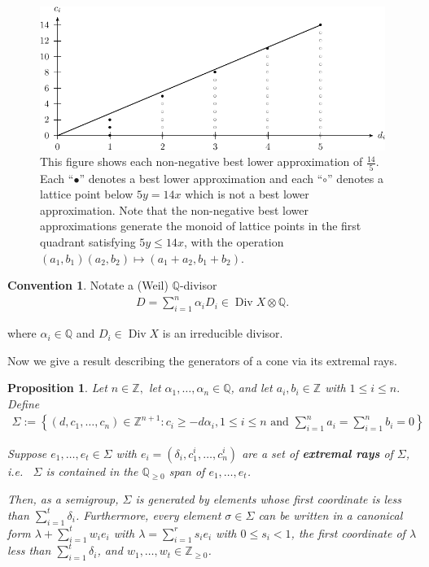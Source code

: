 \documentclass{amsart}
\theoremstyle{plain}
\newtheorem{prop}[thm]{Proposition}
\theoremstyle{definition}
\newtheorem{convention}[thm]{Convention}
\theoremstyle{remark}
\numberwithin{equation}{section}
\newcommand\bq{{\mathbb Q}}
\newcommand\bz{{\mathbb Z}}
\DeclareMathOperator\di{Div}
\newcommand\pdeg{\delta}
\begin{document}
\begin{figure}
\includegraphics{pics/spin-lower-approximations-pic-pics.pdf}
\caption{This figure shows each non-negative best lower
approximation of $\frac{14}{5}.$ Each ``$\bullet$'' denotes a best
lower approximation and each ``$\circ$'' denotes a lattice point
below $5y=14x$ which is not a best lower approximation.  Note that
the non-negative best lower approximations generate the monoid of
lattice points in the first quadrant satisfying  $5y \le 14x$, with
the operation $(a_1, b_1)(a_2, b_2)\mapsto (a_1 + a_2, b_1 + b_2)$.}
\label{fig:s14/5-lattice}
\end{figure}

\begin{convention}
Notate a (Weil) $\bq$-divisor
\begin{align*}
	D = \sum_{i=1}^{n}\alpha_i D_i \in \di X \otimes \bq.
\end{align*}

\noindent
where $\alpha_i \in \bq$ and $D_i \in \di X$ is an irreducible divisor.
\end{convention}

Now we give a result describing the generators of a cone via its
extremal rays.

\begin{prop}
\label{prop:cone-generation}
Let $n \in \bz,$ let $\alpha_1, \ldots, \alpha_n \in \bq$, and let
$a_i, b_i \in \bz$ with $1 \leq i \leq n.$ Define
\begin{align*}
	\Sigma := \left \{(d, c_1, \ldots, c_n) \in \bz^{n + 1} : c_i \geq -
	d \alpha_i, 1 \leq i \leq n \text{ and } \sum_{i = 1}^{n} a_i =
	\sum_{i	= 1}^{n}b_i = 0 \right \}
\end{align*}

\noindent
Suppose $e_1, \ldots, e_t \in \Sigma$ with $e_i = (\pdeg_i, c_1^i,
\ldots, c_n^i)$ are a set of {\bf extremal rays} of $\Sigma$,
i.e.~ $\Sigma$ is contained in the $\bq_{\geq 0}$ span of
$e_1, \ldots, e_t$.

Then, as a semigroup, $\Sigma$ is generated by
elements whose first coordinate is less than $\sum_{i = 1}^{t}
\pdeg_i$. Furthermore, every element $\sigma \in \Sigma$ can be
written in a canonical form $\lambda + \sum_{i = 1}^{t} w_i e_i$ 
with $\lambda = \sum_{i = 1}^{r} s_i e_i$ with $0 \leq s_i < 1$, the
first coordinate of $\lambda$ less than $\sum_{i=1}^{t}\pdeg_i$,
and $w_1, \ldots, w_t \in \bz_{\geq 0}$.
\end{prop}
\end{document}
